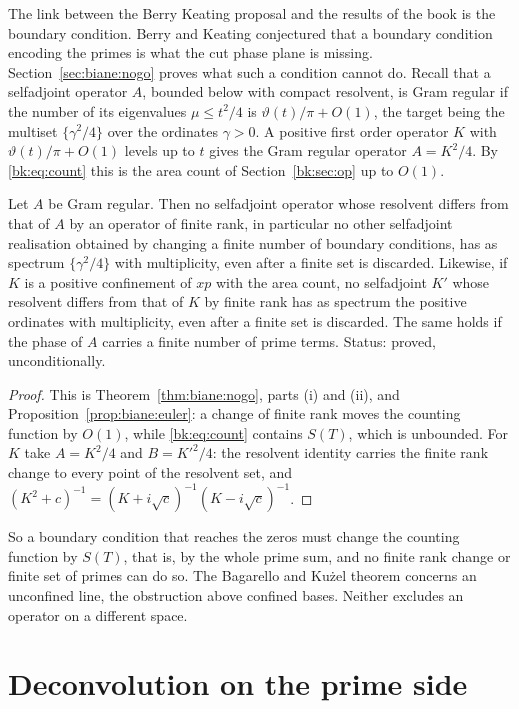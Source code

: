 The link between the Berry Keating proposal and the results of the book is the boundary condition. Berry and Keating conjectured that a boundary condition encoding the primes is what the cut phase plane is missing. Section~\ref{sec:biane:nogo} proves what such a condition cannot do. Recall that a selfadjoint operator $A$, bounded below with compact resolvent, is Gram regular if the number of its eigenvalues $\mu\le t^2/4$ is $\vartheta(t)/\pi+O(1)$, the target being the multiset $\{\gamma^2/4\}$ over the ordinates $\gamma>0$. A positive first order operator $K$ with $\vartheta(t)/\pi+O(1)$ levels up to $t$ gives the Gram regular operator $A=K^2/4$. By \eqref{bk:eq:count} this is the area count of Section~\ref{bk:sec:op} up to $O(1)$.

\begin{proposition}\label{bk:prop:nogo}
Let $A$ be Gram regular. Then no selfadjoint operator whose resolvent differs from that of $A$ by an operator of finite rank, in particular no other selfadjoint realisation obtained by changing a finite number of boundary conditions, has as spectrum $\{\gamma^2/4\}$ with multiplicity, even after a finite set is discarded. Likewise, if $K$ is a positive confinement of $xp$ with the area count, no selfadjoint $K'$ whose resolvent differs from that of $K$ by finite rank has as spectrum the positive ordinates with multiplicity, even after a finite set is discarded. The same holds if the phase of $A$ carries a finite number of prime terms. Status: proved, unconditionally.
\end{proposition}

\begin{proof}
This is Theorem~\ref{thm:biane:nogo}, parts (i) and (ii), and Proposition~\ref{prop:biane:euler}: a change of finite rank moves the counting function by $O(1)$, while \eqref{bk:eq:count} contains $S(T)$, which is unbounded. For $K$ take $A=K^2/4$ and $B=K'^2/4$: the resolvent identity carries the finite rank change to every point of the resolvent set, and $(K^2+c)^{-1}=(K+i\sqrt c)^{-1}(K-i\sqrt c)^{-1}$.
\end{proof}

So a boundary condition that reaches the zeros must change the counting function by $S(T)$, that is, by the whole prime sum, and no finite rank change or finite set of primes can do so. The Bagarello and Ku\.{z}el theorem concerns an unconfined line, the obstruction above confined bases. Neither excludes an operator on a different space.

\section{Deconvolution on the prime side}\label{bk:sec:prime}

